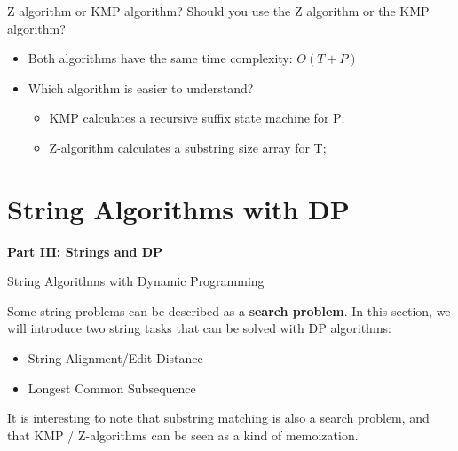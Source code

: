 \begin{frame}{Z algorithm or KMP algorithm?}
  Should you use the Z algorithm or the KMP algorithm?\bigskip

  \begin{itemize}
    \item Both algorithms have the same time complexity: $O(T+P)$\bigskip

    \item Which algorithm is easier to understand?
    \begin{itemize}
      \item KMP calculates a recursive suffix state machine for P;
      \item Z-algorithm calculates a substring size array for T;
    \end{itemize}\bigskip
  \end{itemize}
\end{frame}



\section{String Algorithms with DP} %

\begin{frame}
  \begin{center}
    {\bf Part III: Strings and DP}
  \end{center}
\end{frame}

\begin{frame}{String Algorithms with Dynamic Programming}
  \begin{block}{}
    Some string problems can be described as a {\bf search problem}. In this section, we will introduce two string tasks that can be solved with DP algorithms:\bigskip

    \begin{itemize}
    \item String Alignment/Edit Distance
    \item Longest Common Subsequence
    \end{itemize}
  \end{block}
  \bigskip

  It is interesting to note that substring matching is also a search problem, and that KMP / Z-algorithms can be seen as a kind of memoization.
\end{frame}

